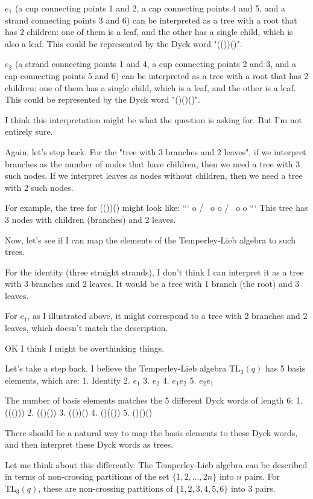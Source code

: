 \documentclass[12p]{article}
\newcounter{reasoningcounter}
\newenvironment{reasoning}[1][]
{\refstepcounter{reasoningcounter}%
\begin{tcolorbox}[
    title=Reasoning \thereasoningcounter: #1,
    colback=white, %
    colframe=gray,
    coltext=black, %
    fonttitle=\bfseries\normalsize,
    top=2mm,
    bottom=2mm,
    enlarge top initially by=5mm
]
\small
}
{\end{tcolorbox}}
\begin{document}
\begin{reasoning}
$e_1$ (a cup connecting points 1 and 2, a cap connecting points 4 and 5, and a strand connecting points 3 and 6) can be interpreted as a tree with a root that has 2 children: one of them is a leaf, and the other has a single child, which is also a leaf. This could be represented by the Dyck word "(())()".

$e_2$ (a strand connecting points 1 and 4, a cup connecting points 2 and 3, and a cap connecting points 5 and 6) can be interpreted as a tree with a root that has 2 children: one of them has a single child, which is a leaf, and the other is a leaf. This could be represented by the Dyck word "()()()".

I think this interpretation might be what the question is asking for. But I'm not entirely sure.

Again, let's step back. For the "tree with 3 branches and 2 leaves", if we interpret branches as the number of nodes that have children, then we need a tree with 3 such nodes. If we interpret leaves as nodes without children, then we need a tree with 2 such nodes.

For example, the tree for (())() might look like:
```
    o
   / \
  o   o
 / \
o   o
```
This tree has 3 nodes with children (branches) and 2 leaves.

Now, let's see if I can map the elements of the Temperley-Lieb algebra to such trees.

For the identity (three straight strands), I don't think I can interpret it as a tree with 3 branches and 2 leaves. It would be a tree with 1 branch (the root) and 3 leaves.

For $e_1$, as I illustrated above, it might correspond to a tree with 2 branches and 2 leaves, which doesn't match the description.

OK I think I might be overthinking things. 

Let's take a step back. I believe the Temperley-Lieb algebra $\text{TL}_3(q)$ has 5 basis elements, which are:
1. Identity
2. $e_1$
3. $e_2$
4. $e_1 e_2$
5. $e_2 e_1$

The number of basis elements matches the 5 different Dyck words of length 6:
1. ((()))
2. (()())
3. (())()
4. ()(())
5. ()()()

There should be a natural way to map the basis elements to these Dyck words, and then interpret these Dyck words as trees.

Let me think about this differently. The Temperley-Lieb algebra can be described in terms of non-crossing partitions of the set $\{1, 2, \ldots, 2n\}$ into $n$ pairs. For $\text{TL}_3(q)$, these are non-crossing partitions of $\{1, 2, 3, 4, 5, 6\}$ into 3 pairs.


\end{reasoning}
\end{document}
